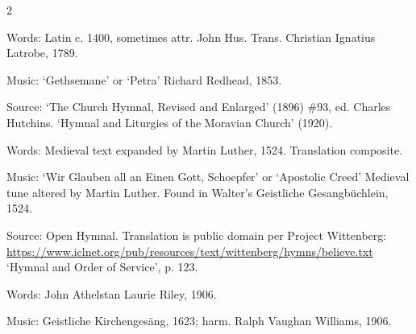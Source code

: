 \begin{multicols}{2}
\par\noindent
Words: Latin c. 1400, sometimes attr. John Hus.  Trans. Christian Ignatius Latrobe, 1789. 
\par\noindent
Music: `Gethsemane' or `Petra' Richard Redhead, 1853. 
\par\noindent
Source: `The Church Hymnal, Revised and Enlarged' (1896) \#93, ed. Charles Hutchins. `Hymnal and Liturgies of the Moravian Church' (1920).


\par\noindent
Words: Medieval text expanded by Martin Luther, 1524.  Translation composite. 
\par\noindent
Music: `Wir Glauben all an Einen Gott, Schoepfer' or `Apostolic Creed' Medieval tune altered by Martin Luther. Found in Walter's Geistliche Gesangbüchlein, 1524. 
\par\noindent
Source: Open Hymnal. Translation is public domain per Project Wittenberg: \url{https://www.iclnet.org/pub/resources/text/wittenberg/hymns/believe.txt} `Hymnal and Order of Service', p. 123.


\par\noindent
Words: John Athelstan Laurie Riley, 1906.
\par\noindent
Music: Geistliche Kirchengesäng, 1623; harm. Ralph Vaughan Williams, 1906.


\fussy
\end{multicols}

\normalsize